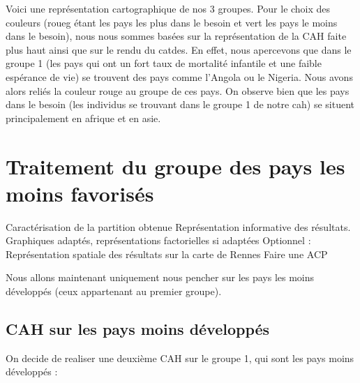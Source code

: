 \documentclass[
]{article}
\newenvironment{Shaded}{}{}
\newcommand{\DecValTok}[1]{#1}
\newcommand{\FunctionTok}[1]{#1}
\newcommand{\NormalTok}[1]{#1}
\newcommand{\OtherTok}[1]{\textcolor[rgb]{1.00,0.25,0.00}{#1}}
\newcommand{\SpecialCharTok}[1]{\textcolor[rgb]{0.00,0.50,0.50}{#1}}
\begin{document}
Voici une représentation cartographique de nos 3 groupes. Pour le choix
des couleurs (roueg étant les pays les plus dans le besoin et vert les
pays le moins dans le besoin), nous nous sommes basées sur la
représentation de la CAH faite plus haut ainsi que sur le rendu du
catdes. En effet, nous apercevons que dans le groupe 1 (les pays qui ont
un fort taux de mortalité infantile et une faible espérance de vie) se
trouvent des pays comme l'Angola ou le Nigeria. Nous avons alors reliés
la couleur rouge au groupe de ces pays. On observe bien que les pays
dans le besoin (les individus se trouvant dans le groupe 1 de notre cah)
se situent principalement en afrique et en asie.

\hypertarget{traitement-du-groupe-des-pays-les-moins-favorisuxe9s}{%
\section{Traitement du groupe des pays les moins
favorisés}\label{traitement-du-groupe-des-pays-les-moins-favorisuxe9s}}

Caractérisation de la partition obtenue Représentation informative des
résultats. Graphiques adaptés, représentations factorielles si adaptées
Optionnel : Représentation spatiale des résultats sur la carte de Rennes
Faire une ACP

Nous allons maintenant uniquement nous pencher sur les pays les moins
développés (ceux appartenant au premier groupe).

\hypertarget{cah-sur-les-pays-moins-duxe9veloppuxe9s}{%
\subsection{CAH sur les pays moins
développés}\label{cah-sur-les-pays-moins-duxe9veloppuxe9s}}

On decide de realiser une deuxième CAH sur le groupe 1, qui sont les
pays moins développés :

\begin{Shaded}
\end{Shaded}
\end{document}
